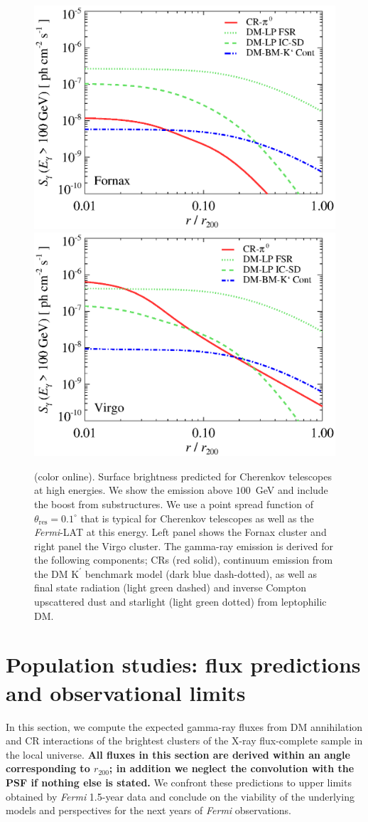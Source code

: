 \documentclass[10pt,aps,pra,reprint,amsmath,amsfonts,amssymb,showpacs,nofootinbib,floatfix]{revtex4-1}
\def\C#1{{\bf #1}}
\newcommand{\Fermi}{{\em Fermi}\xspace}
\newcommand{\rmn}{\mathrm}
\newcommand{\psf}{\theta_\rmn{res}}
\newcommand{\Kp}{\rmn{K}^\prime}
\newcommand{\degs}{^\circ}
\newcommand{\colo}{(color online). }
\newcommand{\rvir}{r_{200}}
\begin{document}
\begin{figure}
\begin{minipage}{2.0\columnwidth}
  \includegraphics[width=0.49\columnwidth]{figures/SB.Fornax.v14.SF700.SubMass.elmu.bw.eps}
  \includegraphics[width=0.49\columnwidth]{figures/SB.Virgo.v14.SF700.SubMass.elmu.bw.eps}
\caption{\colo Surface brightness predicted for Cherenkov
  telescopes at high energies. We show the emission above $100$~GeV
  and include the boost from substructures. We use a point spread
  function of $\psf=0.1\degs$ that is typical for Cherenkov telescopes
  as well as the \Fermi-LAT at this energy. Left panel shows the
  Fornax cluster and right panel the Virgo cluster. The gamma-ray
  emission is derived for the following components; CRs (red solid),
  continuum emission from the DM $\Kp$ benchmark model (dark blue
  dash-dotted), as well as final state radiation (light green dashed)
  and inverse Compton upscattered dust and starlight (light green
  dotted) from leptophilic DM.}
 \label{fig:SB_IACTs}
\end{minipage}
\end{figure}



\section{Population studies: flux predictions and observational limits}

In this section, we compute the expected gamma-ray fluxes from DM
annihilation and CR interactions of the brightest clusters of the
X-ray flux-complete sample in the local universe. \C{All fluxes in
  this section are derived within an angle corresponding to $\rvir$;
  in addition we neglect the convolution with the PSF if nothing else is
  stated.}  We confront these predictions to upper limits obtained by
\Fermi 1.5-year data and conclude on the viability of the underlying
models and perspectives for the next years of \Fermi observations.
\end{document}
